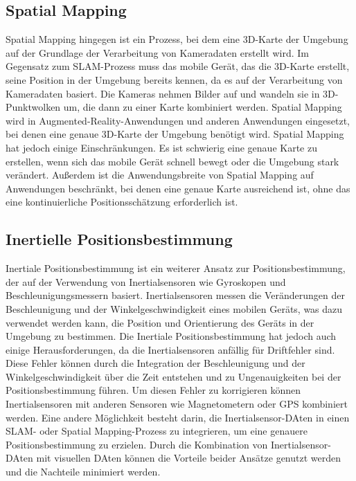     \subsection{Spatial Mapping} \label{spatial_mapping:subsection}
    Spatial Mapping hingegen ist ein Prozess, bei dem eine 3D-Karte der Umgebung auf der Grundlage der Verarbeitung von Kameradaten erstellt wird. Im Gegensatz zum SLAM-Prozess muss das mobile Gerät, das die 3D-Karte erstellt, seine Position in der Umgebung bereits kennen, da es auf der Verarbeitung von Kameradaten basiert. Die Kameras nehmen Bilder auf und wandeln sie in 3D-Punktwolken um, die dann zu einer Karte kombiniert werden. Spatial Mapping wird in Augmented-Reality-Anwendungen und anderen Anwendungen eingesetzt, bei denen eine genaue 3D-Karte der Umgebung benötigt wird.
    Spatial Mapping hat jedoch einige Einschränkungen.
    Es ist schwierig eine genaue Karte zu erstellen, wenn sich das mobile Gerät schnell bewegt oder die Umgebung stark verändert. Außerdem ist die Anwendungsbreite von Spatial Mapping auf Anwendungen beschränkt, bei denen eine genaue Karte ausreichend ist, ohne das eine kontinuierliche Positionsschätzung erforderlich ist.
   
    \subsection{Inertielle Positionsbestimmung} \label{inertielle_positionsbestimmung:subsection}
    Inertiale Positionsbestimmung ist ein weiterer Ansatz zur Positionsbestimmung, der auf der Verwendung von Inertialsensoren wie Gyroskopen und Beschleunigungsmessern basiert. Inertialsensoren messen die Veränderungen der Beschleunigung und der Winkelgeschwindigkeit eines mobilen Geräts, was dazu verwendet werden kann, die Position und Orientierung des Geräts in der Umgebung zu bestimmen. Die Inertiale Positionsbestimmung hat jedoch auch einige Herausforderungen, da die Inertialsensoren anfällig für Driftfehler sind. Diese Fehler können durch die Integration der Beschleunigung und der Winkelgeschwindigkeit über die Zeit entstehen und zu Ungenauigkeiten bei der Positionsbestimmung führen. Um diesen Fehler zu korrigieren können Inertialsensoren mit anderen Sensoren wie Magnetometern oder GPS kombiniert werden.
    Eine andere Möglichkeit besteht darin, die Inertialsensor-DAten in einen SLAM- oder Spatial Mapping-Prozess zu integrieren, um eine genauere Positionsbestimmung zu erzielen. Durch die Kombination von Inertialsensor-DAten mit visuellen DAten können die Vorteile beider Ansätze genutzt werden und die Nachteile minimiert werden.


